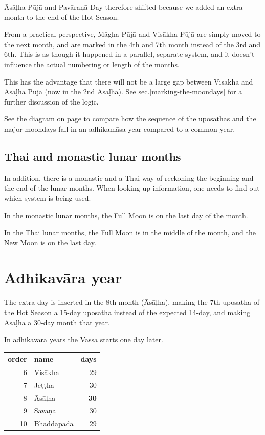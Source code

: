 \documentclass[11pt,oneside]{memoir-article}
\begin{document}
Āsāḷha Pūjā and Pavāraṇā Day therefore shifted because we added an extra month
to the end of the Hot Season.

From a practical perspective, Māgha Pūjā and Visākha Pūjā are simply moved to
the next month, and are marked in the 4th and 7th month instead of the 3rd and
6th. This is as though it happened in a parallel, separate system, and it
doesn't influence the actual numbering or length of the months.

This has the advantage that there will not be a large gap between Visākha and
Āsāḷha Pūjā (now in the 2nd Āsāḷha). See sec.\ref{marking-the-moondays} for a
further discussion of the logic.

See the diagram on page \pageref{dia-common-adhikamasa-adhikavara} to compare
how the sequence of the uposathas and the major moondays fall in an adhikamāsa
year compared to a common year.

\subsection{Thai and monastic lunar months}
\label{sec-1-3-2}

In addition, there is a monastic and a Thai way of reckoning the beginning and the
end of the lunar months. When looking up information, one needs to find out
which system is being used.

In the monastic lunar months, the Full Moon is on the last day of the month.

In the Thai lunar months, the Full Moon is in the middle of the month, and the
New Moon is on the last day.

\section{Adhikavāra year}
\label{sec-1-4}

The extra day is inserted in the 8th month (Āsāḷha), making the 7th uposatha of
the Hot Season a 15-day uposatha instead of the expected 14-day, and making
Āsāḷha a 30-day month that year.\cite{hasapannyo-zodiac}

In adhikavāra years the Vassa starts one day later.

\begin{center}
\begin{tabular}{rlr}
order & name & days\\
\hline
6 & Visākha & 29\\
7 & Jeṭṭha & 30\\
8 & Āsāḷha & \textbf{30}\\
9 & Savaṇa & 30\\
10 & Bhaddapāda & 29\\
\end{tabular}
\end{center}
\end{document}
